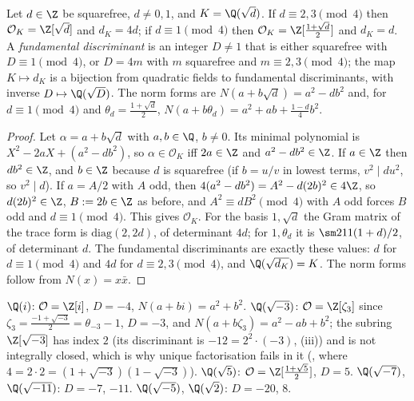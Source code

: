 \begin{proposition}\label{prop:ant:quadraticintegers}
Let $d\in\Z$ be squarefree, $d\ne0,1$, and $K=\Q(\sqrt d)$. If $d\equiv2,3\pmod4$ then $\mathcal O_K=\Z[\sqrt d]$ and $d_K=4d$; if $d\equiv1\pmod4$
then $\mathcal O_K=\Z[\frac{1+\sqrt d}2]$ and $d_K=d$. A \emph{fundamental discriminant} is an integer $D\ne1$ that is either squarefree with
$D\equiv1\pmod4$, or $D=4m$ with $m$ squarefree and $m\equiv2,3\pmod4$; the map $K\mapsto d_K$ is a bijection from quadratic fields to fundamental
discriminants, with inverse $D\mapsto\Q(\sqrt D)$. The norm forms are $N(a+b\sqrt d)=a^2-db^2$ and, for $d\equiv1\pmod4$ and $\theta_d=\frac{1+\sqrt d}2$,
$N(a+b\theta_d)=a^2+ab+\frac{1-d}4b^2$.
\end{proposition}

\begin{proof}
Let $\alpha=a+b\sqrt d$ with $a,b\in\Q$, $b\ne0$. Its minimal polynomial is $X^2-2aX+(a^2-db^2)$, so $\alpha\in\mathcal O_K$ iff $2a\in\Z$ and
$a^2-db^2\in\Z$. If $a\in\Z$ then $db^2\in\Z$, and $b\in\Z$ because $d$ is squarefree (if $b=u/v$ in lowest terms, $v^2\mid du^2$, so $v^2\mid d$). If
$a=A/2$ with $A$ odd, then $4(a^2-db^2)=A^2-d(2b)^2\in4\Z$, so $d(2b)^2\in\Z$, $B:=2b\in\Z$ as before, and $A^2\equiv dB^2\pmod4$ with $A$ odd forces
$B$ odd and $d\equiv1\pmod4$. This gives $\mathcal O_K$. For the basis $1,\sqrt d$ the Gram matrix of the trace form is $\mathrm{diag}(2,2d)$, of
determinant $4d$; for $1,\theta_d$ it is $\sm21 1{(1+d)/2}$, of determinant $d$. The fundamental discriminants are exactly these values: $d$ for
$d\equiv1\pmod4$ and $4d$ for $d\equiv2,3\pmod4$, and $\Q(\sqrt{d_K})=K$. The norm forms follow from $N(x)=x\bar x$.
\end{proof}

\begin{example}\label{ex:ant:quadraticrings}
$\Q(i)$: $\mathcal O=\Z[i]$, $D=-4$, $N(a+bi)=a^2+b^2$. $\Q(\sqrt{-3})$: $\mathcal O=\Z[\zeta_3]$ since $\zeta_3=\frac{-1+\sqrt{-3}}2=\theta_{-3}-1$, $D=-3$,
and $N(a+b\zeta_3)=a^2-ab+b^2$; the subring $\Z[\sqrt{-3}]$ has index $2$ (its discriminant is $-12=2^2\cdot(-3)$, (iii)) and is
not integrally closed, which is why unique factorisation fails in it (, where $4=2\cdot2=(1+\sqrt{-3})(1-\sqrt{-3})$). $\Q(\sqrt5)$:
$\mathcal O=\Z[\frac{1+\sqrt5}2]$, $D=5$. $\Q(\sqrt{-7})$, $\Q(\sqrt{-11})$: $D=-7$, $-11$. $\Q(\sqrt{-5})$, $\Q(\sqrt2)$: $D=-20$, $8$.
\end{example}

